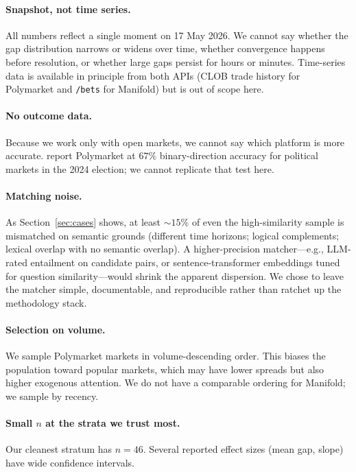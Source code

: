 \documentclass{article}
\begin{document}
\paragraph{Snapshot, not time series.} All numbers reflect a single moment on 17 May 2026. We cannot say whether the gap distribution narrows or widens over time, whether convergence happens before resolution, or whether large gaps persist for hours or minutes. Time-series data is available in principle from both APIs (CLOB trade history for Polymarket and \texttt{/bets} for Manifold) but is out of scope here.

\paragraph{No outcome data.} Because we work only with open markets, we cannot say which platform is more accurate. \citet{clinton2025prediction} report Polymarket at $67\%$ binary-direction accuracy for political markets in the 2024 election; we cannot replicate that test here.

\paragraph{Matching noise.} As Section~\ref{sec:cases} shows, at least $\sim\!15\%$ of even the high-similarity sample is mismatched on semantic grounds (different time horizons; logical complements; lexical overlap with no semantic overlap). A higher-precision matcher---e.g., LLM-rated entailment on candidate pairs, or sentence-transformer embeddings tuned for question similarity---would shrink the apparent dispersion. We chose to leave the matcher simple, documentable, and reproducible rather than ratchet up the methodology stack.

\paragraph{Selection on volume.} We sample Polymarket markets in volume-descending order. This biases the population toward popular markets, which may have lower spreads but also higher exogenous attention. We do not have a comparable ordering for Manifold; we sample by recency.

\paragraph{Small $n$ at the strata we trust most.} Our cleanest stratum has $n=46$. Several reported effect sizes (mean gap, slope) have wide confidence intervals.
\end{document}
